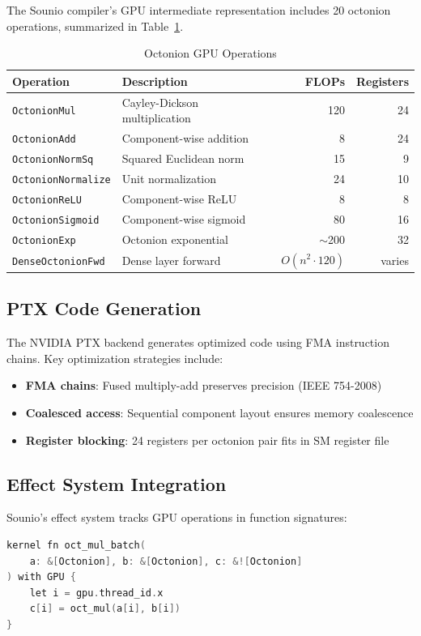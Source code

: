 \documentclass[11pt,a4paper]{article}
\begin{document}
The Sounio compiler's GPU intermediate representation includes 20 octonion operations, summarized in Table~\ref{tab:operations}.

\begin{table}[h]
\centering
\caption{Octonion GPU Operations}
\label{tab:operations}
\begin{tabular}{@{}llrr@{}}
\toprule
Operation & Description & FLOPs & Registers \\
\midrule
\texttt{OctonionMul} & Cayley-Dickson multiplication & 120 & 24 \\
\texttt{OctonionAdd} & Component-wise addition & 8 & 24 \\
\texttt{OctonionNormSq} & Squared Euclidean norm & 15 & 9 \\
\texttt{OctonionNormalize} & Unit normalization & 24 & 10 \\
\texttt{OctonionReLU} & Component-wise ReLU & 8 & 8 \\
\texttt{OctonionSigmoid} & Component-wise sigmoid & 80 & 16 \\
\texttt{OctonionExp} & Octonion exponential & $\sim$200 & 32 \\
\texttt{DenseOctonionFwd} & Dense layer forward & $O(n^2 \cdot 120)$ & varies \\
\bottomrule
\end{tabular}
\end{table}

\subsection{PTX Code Generation}

The NVIDIA PTX backend generates optimized code using FMA instruction chains. Key optimization strategies include:
\begin{itemize}
    \item \textbf{FMA chains}: Fused multiply-add preserves precision (IEEE 754-2008)
    \item \textbf{Coalesced access}: Sequential component layout ensures memory coalescence
    \item \textbf{Register blocking}: 24 registers per octonion pair fits in SM register file
\end{itemize}

\subsection{Effect System Integration}

Sounio's effect system tracks GPU operations in function signatures:
\begin{lstlisting}[language=C]
kernel fn oct_mul_batch(
    a: &[Octonion], b: &[Octonion], c: &![Octonion]
) with GPU {
    let i = gpu.thread_id.x
    c[i] = oct_mul(a[i], b[i])
}
\end{lstlisting}
\end{document}
